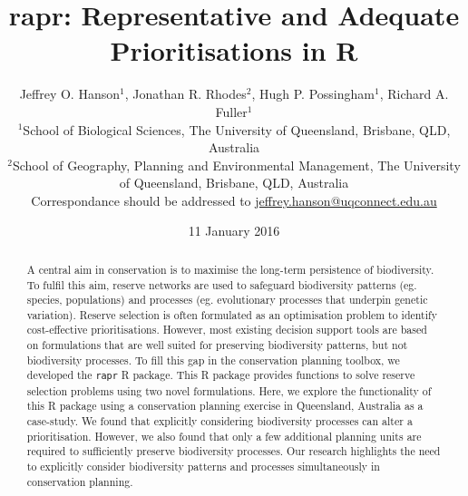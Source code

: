 \documentclass[11pt,]{article}
\title{rapr: Representative and Adequate Prioritisations in R}
\author{Jeffrey O. Hanson$^1$, Jonathan R. Rhodes$^2$, Hugh P. Possingham$^1$,
Richard A. Fuller$^1$\\$^1$School of Biological Sciences, The University
of Queensland, Brisbane, QLD, Australia\\$^2$School of Geography,
Planning and Environmental Management, The University of Queensland,
Brisbane, QLD, Australia\\Correspondance should be addressed to
\href{mailto:jeffrey.hanson@uqconnect.edu.au}{jeffrey.hanson@uqconnect.edu.au}}
\date{11 January 2016}
\begin{document}
\maketitle

\begin{abstract}
A central aim in conservation is to maximise the long-term persistence
of biodiversity. To fulfil this aim, reserve networks are used to
safeguard biodiversity patterns (eg. species, populations) and processes
(eg. evolutionary processes that underpin genetic variation). Reserve
selection is often formulated as an optimisation problem to identify
cost-effective prioritisations. However, most existing decision support
tools are based on formulations that are well suited for preserving
biodiversity patterns, but not biodiversity processes. To fill this gap
in the conservation planning toolbox, we developed the \texttt{rapr} R
package. This R package provides functions to solve reserve selection
problems using two novel formulations. Here, we explore the
functionality of this R package using a conservation planning exercise
in Queensland, Australia as a case-study. We found that explicitly
considering biodiversity processes can alter a prioritisation. However,
we also found that only a few additional planning units are required to
sufficiently preserve biodiversity processes. Our research highlights
the need to explicitly consider biodiversity patterns and processes
simultaneously in conservation planning.
\end{abstract}
\end{document}
